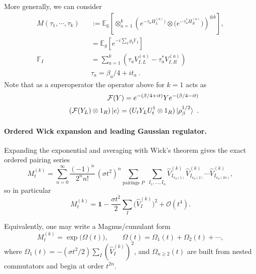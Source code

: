 \documentclass{article}
\theoremstyle{definition}
\newcommand{\nn}{\nonumber}
\newcommand{\lb}{\left(}
\newcommand{\rb}{\right)}
\begin{document}
    More generally, we can consider
    \begin{eqnarray}
        M(\tau_1,\cdots,\tau_k)&&:=\mathbb{E_g}\!\left[\otimes_{a=1}^k \lb e^{-\tau_a H_L^{(a)})}\otimes
        \big(e^{-\tau_a^* H_R^{(a)}}\big)\rb^{\otimes k}\right],\nn\\
        &&=\mathbb{E}_g\left[ e^{-i \sum_I g_I \mathbb{F}_I}\right]\nn\\
        \mathbb{F}_I&&=\sum_{a=1}^k(\tau_a V^{(a)}_{I,L}-\tau_a^* V^{(a)}_{I,R})\nn\\
        &&\tau_a=\beta_a/4+it_a\ .
    \end{eqnarray}
    Note that as a superoperator the operator above for $k=1$ acts as
    \begin{eqnarray}
        &&\mathcal{F}(Y)=e^{-(\beta/4+it)}Y e^{-(\beta/4-it)}\nn\\
        &&(\mathcal{F}(Y_L)\otimes 1_R)\ket{e}=(U_t Y_L U_t^\dagger\otimes 1_R)\ket{\rho_\beta^{1/2}}\ .
    \end{eqnarray}

    \paragraph{Ordered Wick expansion and leading Gaussian regulator.}
    Expanding the exponential and averaging with Wick's theorem gives the exact ordered
    pairing series
    \begin{equation}
        M_{t}^{(k)}= \sum_{n=0}^{\infty}\frac{(-1)^{n}}{2^{n}n!}\,(\sigma t^{2})^{n}
        \sum_{\text{pairings }P}\; \sum_{I_1,\dots,I_n}\widehat V_{I_{\pi_P(1)}}^{(k)}
        \widehat V_{I_{\pi_P(2)}}^{(k)}\cdots \widehat V_{I_{\pi_P(2n)}}^{(k)}, \label{eq:ordered_wick_quenched}
    \end{equation}
    so in particular
    \begin{equation}
        M_{t}^{(k)}= \mathbf{1}-\frac{\sigma t^{2}}{2}\sum_{I}\big(\widehat V_{I}
        ^{(k)}\big)^{2}+\mathcal{O}(t^{4}). \label{eq:Mt_smallt}
    \end{equation}

    Equivalently, one may write a Magnus/cumulant form
    \begin{equation}
        M_{t}^{(k)}=\exp\!\big(\Omega(t)\big), \qquad \Omega(t)=\Omega_{1}(t)+\Omega
        _{2}(t)+\cdots,
    \end{equation}
    where $\Omega_{1}(t)=-(\sigma t^{2}/2)\sum_{I}(\widehat V_{I}^{(k)})^{2}$,
    and $\Omega_{n\ge 2}(t)$ are built from nested commutators and begin at
    order $t^{2n}$.
\end{document}
